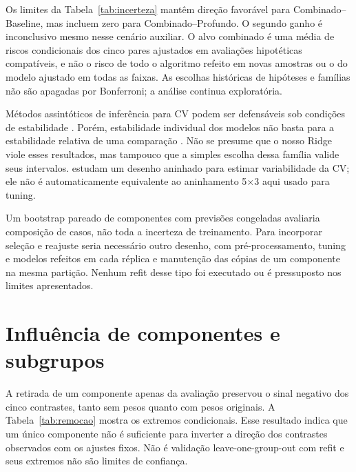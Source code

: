 
\FloatBarrier

Os limites da Tabela~\ref{tab:incerteza} mantêm direção favorável para Combinado--Baseline, mas incluem zero para Combinado--Profundo. O segundo ganho é inconclusivo mesmo nesse cenário auxiliar. O alvo combinado é uma média de riscos condicionais dos cinco pares ajustados em avaliações hipotéticas compatíveis, e não o risco de todo o algoritmo refeito em novas amostras ou o do modelo ajustado em todas as faixas. As escolhas históricas de hipóteses e famílias não são apagadas por Bonferroni; a análise continua exploratória.

Métodos assintóticos de inferência para CV podem ser defensáveis sob condições de estabilidade \citep{bayle2020}. Porém, estabilidade individual dos modelos não basta para a estabilidade relativa de uma comparação \citep{bayle2026}. Não se presume que o nosso Ridge viole esses resultados, mas tampouco que a simples escolha dessa família valide seus intervalos. \citet{bates2024} estudam um desenho aninhado para estimar variabilidade da CV; ele não é automaticamente equivalente ao aninhamento 5$\times$3 aqui usado para tuning.

Um bootstrap pareado de componentes com previsões congeladas avaliaria composição de casos, não toda a incerteza de treinamento. Para incorporar seleção e reajuste seria necessário outro desenho, com pré-processamento, tuning e modelos refeitos em cada réplica e manutenção das cópias de um componente na mesma partição. Nenhum refit desse tipo foi executado ou é pressuposto nos limites apresentados.

\section{Influência de componentes e subgrupos}
A retirada de um componente apenas da avaliação preservou o sinal negativo dos cinco contrastes, tanto sem pesos quanto com pesos originais. A Tabela~\ref{tab:remocao} mostra os extremos condicionais. Esse resultado indica que um único componente não é suficiente para inverter a direção dos contrastes observados com os ajustes fixos. Não é validação leave-one-group-out com refit e seus extremos não são limites de confiança.




